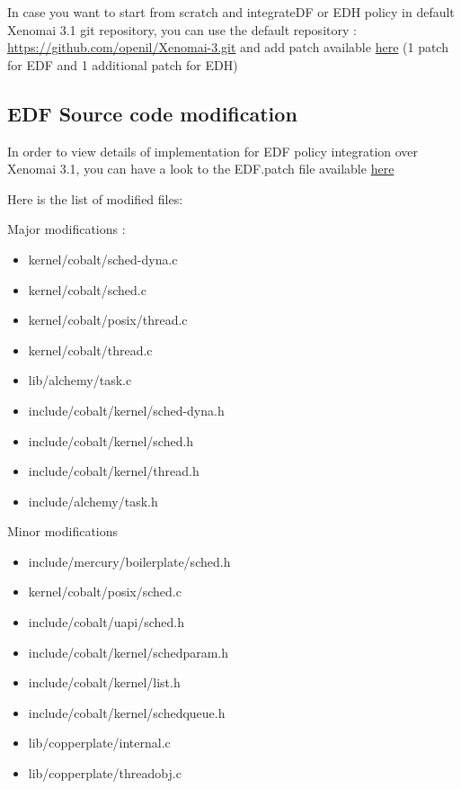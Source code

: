 \documentclass[12pt,hidelinks]{article}
\begin{document}
{\begin{itemize}
    \end{itemize}
    
    In case you want to start from scratch and integrate\cite{EDF}DF or EDH policy in default Xenomai 3.1 git repository, you can use the default repository : \href{https://github.com/openil/Xenomai-3.git}{https://github.com/openil/Xenomai-3.git} and add patch available \href{https://github.com/skyultime/M2_ERTS_Project_Xenomai_edh/tree/dev/SourceCode/Patch}{here} (1 patch for EDF and 1 additional patch for EDH)

    \subsection{EDF Source code modification}
        
        In order to view details of implementation for EDF policy integration over Xenomai 3.1, you can have a look to the EDF.patch file available \href{https://github.com/skyultime/M2_ERTS_Project_Xenomai_edh/blob/dev/SourceCode/Patch/EDF.patch}{here}

        Here is the list of modified files:
        
        Major modifications :
        \begin{itemize}
            \item kernel/cobalt/sched-dyna.c
            \item kernel/cobalt/sched.c
            \item kernel/cobalt/posix/thread.c
            \item kernel/cobalt/thread.c
            \item lib/alchemy/task.c
            \item include/cobalt/kernel/sched-dyna.h
            \item include/cobalt/kernel/sched.h
            \item include/cobalt/kernel/thread.h
            \item include/alchemy/task.h
        \end{itemize}
        
        Minor modifications
        \begin{itemize}
            \item         include/mercury/boilerplate/sched.h
            \item kernel/cobalt/posix/sched.c
            \item include/cobalt/uapi/sched.h
            \item include/cobalt/kernel/schedparam.h
            \item include/cobalt/kernel/list.h
            \item include/cobalt/kernel/schedqueue.h
            \item lib/copperplate/internal.c
            \item lib/copperplate/threadobj.c
        \end{itemize}

}
\end{document}
